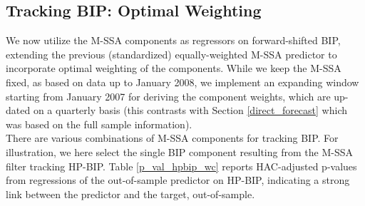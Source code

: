 \documentclass[a4paper]{article}
\begin{document}
\subsection{Tracking BIP: Optimal Weighting}


We now utilize the M-SSA components as regressors on forward-shifted BIP, extending the previous (standardized) equally-weighted M-SSA predictor to incorporate optimal weighting of the components. While we keep the M-SSA fixed, as based on data up to January 2008, we implement an expanding window starting from January 2007 for deriving the component weights, which are up-dated on a quarterly basis (this contrasts with Section \eqref{direct_forecast} which was based on the full sample information). \\


There are various combinations of M-SSA components for tracking BIP. For illustration, we here select the single BIP component resulting from the M-SSA filter tracking HP-BIP. Table \eqref{p_val_hpbip_wc} reports HAC-adjusted p-values from regressions of the out-of-sample predictor on HP-BIP, indicating a strong link between the predictor and the target, out-of-sample. 
\end{document}
